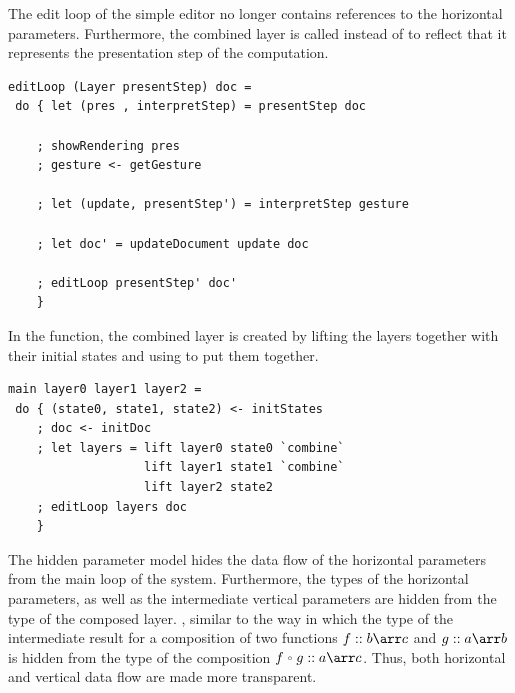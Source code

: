 \documentclass[preprint,natbib]{sigplanconf}
\begin{document}

The edit loop of the simple editor no longer contains references to the horizontal parameters. Furthermore, the combined layer is called  instead of  to reflect that it represents the presentation step of the computation.

\begin{small}
\begin{verbatim}
editLoop (Layer presentStep) doc = 
 do { let (pres , interpretStep) = presentStep doc
    
    ; showRendering pres
    ; gesture <- getGesture
    
    ; let (update, presentStep') = interpretStep gesture
    
    ; let doc' = updateDocument update doc
    
    ; editLoop presentStep' doc'
    }
\end{verbatim}
\end{small}

In the  function, the combined layer is created by lifting the layers together with their initial states and using  to put them together.

\begin{small}
\begin{verbatim}
main layer0 layer1 layer2 =
 do { (state0, state1, state2) <- initStates
    ; doc <- initDoc 
    ; let layers = lift layer0 state0 `combine` 
                   lift layer1 state1 `combine`
                   lift layer2 state2
    ; editLoop layers doc
    }
\end{verbatim}
\end{small}


The hidden parameter model hides the data flow of the horizontal parameters from the main loop of the system. Furthermore, the types of the horizontal parameters, as well as the intermediate vertical parameters are hidden from the type of the composed layer. \bc, similar to the way in which the type of the intermediate result for a composition of two functions $f :: b \arr c$ and $g :: a \arr b$ is hidden from the type of the composition $f \oo g :: a \arr c$. \ec Thus, both horizontal and vertical data flow are made more transparent. 


\end{document}
